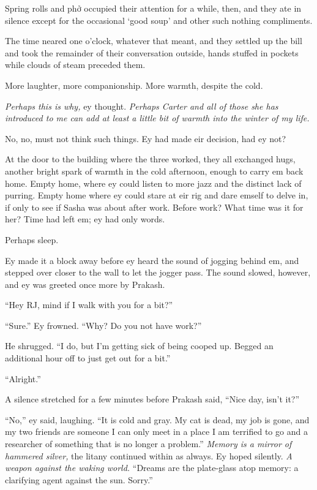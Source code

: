 Spring rolls and phở occupied their attention for a while, then, and they ate in silence except for the occasional `good soup' and other such nothing compliments.

The time neared one o'clock, whatever that meant, and they settled up the bill and took the remainder of their conversation outside, hands stuffed in pockets while clouds of steam preceded them.

More laughter, more companionship. More warmth, despite the cold.

\emph{Perhaps this is why,} ey thought. \emph{Perhaps Carter and all of those she has introduced to me can add at least a little bit of warmth into the winter of my life.}

No, no, must not think such things. Ey had made eir decision, had ey not?

At the door to the building where the three worked, they all exchanged hugs, another bright spark of warmth in the cold afternoon, enough to carry em back home. Empty home, where ey could listen to more jazz and the distinct lack of purring. Empty home where ey could stare at eir rig and dare emself to delve in, if only to see if Sasha was about after work. Before work? What time was it for her? Time had left em; ey had only words.

Perhaps sleep.

Ey made it a block away before ey heard the sound of jogging behind em, and stepped over closer to the wall to let the jogger pass. The sound slowed, however, and ey was greeted once more by Prakash.

``Hey RJ, mind if I walk with you for a bit?''

``Sure.'' Ey frowned. ``Why? Do you not have work?''

He shrugged. ``I do, but I'm getting sick of being cooped up. Begged an additional hour off to just get out for a bit.''

``Alright.''

A silence stretched for a few minutes before Prakash said, ``Nice day, isn't it?''

``No,'' ey said, laughing. ``It is cold and gray. My cat is dead, my job is gone, and my two friends are someone I can only meet in a place I am terrified to go and a researcher of something that is no longer a problem.'' \emph{Memory is a mirror of hammered silver,} the litany continued within as always. Ey hoped silently. \emph{A weapon against the waking world.} ``Dreams are the plate-glass atop memory: a clarifying agent against the sun. Sorry.''


